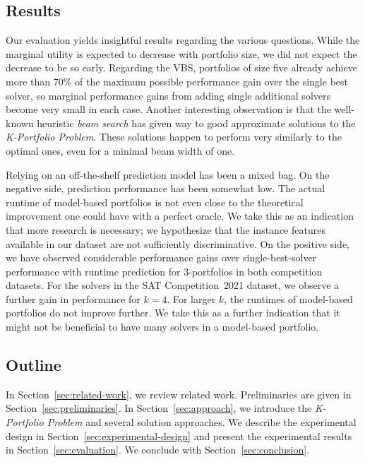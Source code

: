 \documentclass[a4paper,USenglish,pdfa]{lipics-v2021} %
\begin{document}
\subsection{Results}

Our evaluation yields insightful results regarding the various questions. 
While the marginal utility is expected to decrease with portfolio size, we did not expect the decrease to be so early. 
Regarding the VBS, portfolios of size five already achieve more than 70\% of the maximum possible performance gain over the single best solver, so marginal performance gains from adding single additional solvers become very small in each case. 
Another interesting observation is that the well-known heuristic \emph{beam search} has given way to good approximate solutions to the \emph{K-Portfolio Problem}. 
These solutions happen to perform very similarly to the optimal ones, even for a minimal beam width of one.

Relying on an off-the-shelf prediction model has been a mixed bag. 
On the negative side, prediction performance has been somewhat low. 
The actual runtime of model-based portfolios is not even close to the theoretical improvement one could have with a perfect oracle.
We take this as an indication that more research is necessary; we hypothesize that the instance features available in our dataset are not sufficiently discriminative. 
On the positive side, we have observed considerable performance gains over single-best-solver performance with runtime prediction for $3$-portfolios in both competition datasets. 
For the solvers in the SAT Competition~2021 dataset, we observe a further gain in performance for $k = 4$. 
For larger $k$, the runtimes of model-based portfolios do not improve further. 
We take this as a further indication that it might not be beneficial to have many solvers in a model-based portfolio. 

\subsection{Outline}

In Section~\ref{sec:related-work}, we review related work. 
Preliminaries are given in Section~\ref{sec:preliminaries}. 
In Section~\ref{sec:approach}, we introduce the \emph{K-Portfolio Problem} and several solution approaches. 
We describe the experimental design in Section~\ref{sec:experimental-design} and present the experimental results in Section~\ref{sec:evaluation}. 
We conclude with Section~\ref{sec:conclusion}. 
\end{document}
